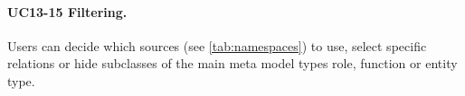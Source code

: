 \documentclass[conference]{IEEEtran}
\begin{document}
\paragraph{UC13-15 Filtering.}
Users can decide which sources (see \cref{tab:namespaces}) to use, select specific relations or hide subclasses of the main meta model types role, function or entity type.

\end{document}
